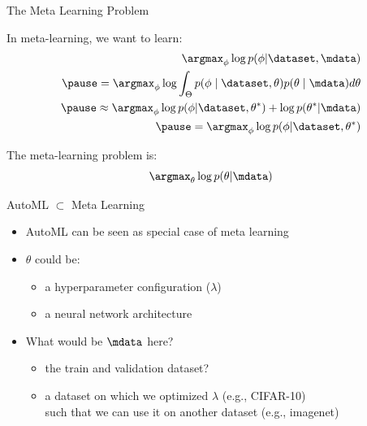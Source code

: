 \begin{frame}[c]{The Meta Learning Problem}

In meta-learning, we want to learn:
\begin{eqnarray}
\argmax_{\phi} \log p(\phi|\dataset, \mdata) \\
\pause
= \argmax_{\phi} \log \int_{\Theta} p(\phi \mid \dataset, \theta) p(\theta \mid \mdata) d\theta\\
\pause
\approx \argmax_{\phi} \log p(\phi | \dataset, \theta^*) + \log p(\theta^* | \mdata)\\
\pause
= \argmax_{\phi} \log p(\phi | \dataset, \theta^*)
\end{eqnarray}

\pause

The meta-learning problem is:
\begin{equation}
\argmax_{\theta} \log p(\theta | \mdata)
\end{equation}


\end{frame}
\begin{frame}[c]{AutoML $\subset$ Meta Learning}

\begin{itemize}
	\item AutoML can be seen as special case of meta learning
	\pause
	\medskip
	\item $\theta$ could be:
	\begin{itemize}
		\item a hyperparameter configuration ($\lambda$) 
		\item a neural network architecture
	\end{itemize}
	\pause
	\medskip
	\item What would be $\mdata$ here?
	\begin{itemize}
		\item the train and validation dataset?
		\item a dataset on which we optimized $\lambda$ (e.g., CIFAR-10)\\ such that we can use it on another dataset (e.g., imagenet)
	\end{itemize}
\end{itemize}	

\end{frame}

